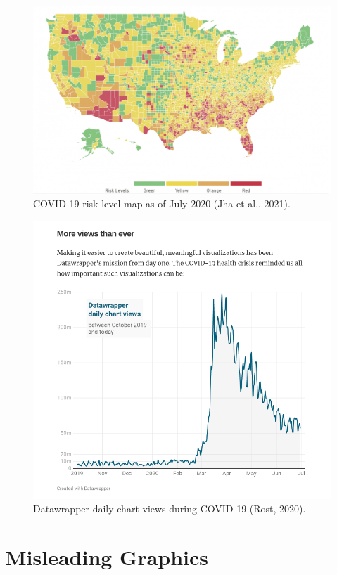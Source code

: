 \documentclass[print]{nuthesis}
\begin{document}
\begin{figure}[tbp]

{\centering \includegraphics[width=0.75\linewidth,]{images/covid19-summer2020-risk-map} 

}

\caption[COVID-19 risk level map as of July 2020]{COVID-19 risk level map as of July 2020 (Jha et al., 2021).}\label{fig:covid19-summer2020-risk-map}
\end{figure}

\begin{figure}[tbp]

{\centering \includegraphics[width=0.75\linewidth,]{images/covid19-datawrapper-views-july2020} 

}

\caption[Datawrapper daily chart views during COVID-19]{Datawrapper daily chart views during COVID-19 (Rost, 2020).}\label{fig:covid19-datawrapper-views-july2020}
\end{figure}

\hypertarget{misleading-graphics}{%
\section{Misleading Graphics}\label{misleading-graphics}}
\end{document}
